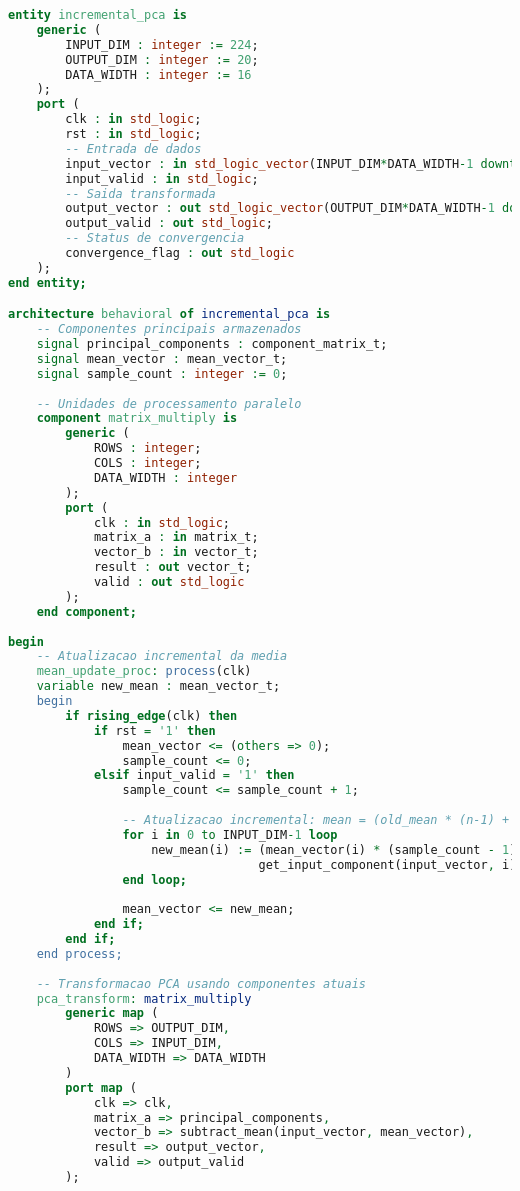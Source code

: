 \begin{lstlisting}[language=VHDL]
entity incremental_pca is
    generic (
        INPUT_DIM : integer := 224;
        OUTPUT_DIM : integer := 20;
        DATA_WIDTH : integer := 16
    );
    port (
        clk : in std_logic;
        rst : in std_logic;
        -- Entrada de dados
        input_vector : in std_logic_vector(INPUT_DIM*DATA_WIDTH-1 downto 0);
        input_valid : in std_logic;
        -- Saida transformada
        output_vector : out std_logic_vector(OUTPUT_DIM*DATA_WIDTH-1 downto 0);
        output_valid : out std_logic;
        -- Status de convergencia
        convergence_flag : out std_logic
    );
end entity;

architecture behavioral of incremental_pca is
    -- Componentes principais armazenados
    signal principal_components : component_matrix_t;
    signal mean_vector : mean_vector_t;
    signal sample_count : integer := 0;
    
    -- Unidades de processamento paralelo
    component matrix_multiply is
        generic (
            ROWS : integer;
            COLS : integer;
            DATA_WIDTH : integer
        );
        port (
            clk : in std_logic;
            matrix_a : in matrix_t;
            vector_b : in vector_t;
            result : out vector_t;
            valid : out std_logic
        );
    end component;
    
begin
    -- Atualizacao incremental da media
    mean_update_proc: process(clk)
    variable new_mean : mean_vector_t;
    begin
        if rising_edge(clk) then
            if rst = '1' then
                mean_vector <= (others => 0);
                sample_count <= 0;
            elsif input_valid = '1' then
                sample_count <= sample_count + 1;
                
                -- Atualizacao incremental: mean = (old_mean * (n-1) + new_sample) / n
                for i in 0 to INPUT_DIM-1 loop
                    new_mean(i) := (mean_vector(i) * (sample_count - 1) + 
                                   get_input_component(input_vector, i)) / sample_count;
                end loop;
                
                mean_vector <= new_mean;
            end if;
        end if;
    end process;
    
    -- Transformacao PCA usando componentes atuais
    pca_transform: matrix_multiply
        generic map (
            ROWS => OUTPUT_DIM,
            COLS => INPUT_DIM,
            DATA_WIDTH => DATA_WIDTH
        )
        port map (
            clk => clk,
            matrix_a => principal_components,
            vector_b => subtract_mean(input_vector, mean_vector),
            result => output_vector,
            valid => output_valid
        );
        

\end{lstlisting}
